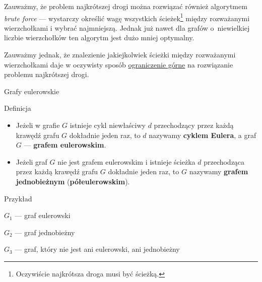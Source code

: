 \documentclass[a4paper,10pt]{beamer}
\begin{document}
\begin{frame}

Zauważmy, że problem najkrótszej drogi można rozwiązać również algorytmem {\it brute force} --- wystarczy określić wagę wszystkich ścieżek\footnote{Oczywiście najkrótsza droga musi być ścieżką.} między rozważanymi wierzchołkami i wybrać najmniejszą. Jednak już nawet dla grafów o~niewielkiej liczbie wierzchołków ten algorytm jest dużo mniej optymalny.

\medskip

Zauważmy jednak, że znalezienie jakiejkolwiek ścieżki między rozważanymi wierzchołkami daje w oczywisty sposób \underline{ograniczenie górne} na rozwiązanie problemu najkrótszej drogi.

\end{frame}



\begin{frame}{Grafy eulerowskie}

	\begin{block}{Definicja}
\begin{itemize}
	\item	Jeżeli w grafie $G$ istnieje cykl niewłaściwy $d$ przechodzący przez każdą krawędź grafu $G$ dokładnie jeden raz, to $d$ nazywamy {\bf cyklem Eulera}, a graf $G$ --- {\bf grafem eulerowskim}.
	\item Jeżeli graf $G$ nie jest grafem eulerowskim i istnieje ścieżka $d$ przechodząca przez każdą krawędź grafu $G$ dokładnie jeden raz, to $G$ nazywamy {\bf grafem jednobieżnym} ({\bf półeulerowskim}).
\end{itemize}
	\end{block}

\medskip

\begin{exampleblock}{Przykład}
		\begin{minipage}{.6\textwidth}
			\begin{center}
		
			\end{center}
		\end{minipage}
\hfill
		\begin{minipage}{.35\textwidth}
$G_1$ --- graf eulerowski

\medskip

$G_2$ --- graf jednobieżny

\medskip

$G_3$ --- graf, który nie jest ani eulerowski, ani jednobieżny
		\end{minipage}
\end{exampleblock}
\end{frame}
\end{document}
